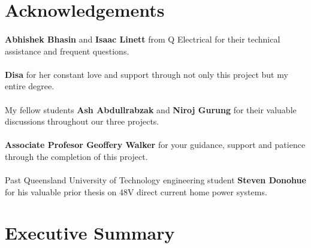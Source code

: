 \newpage


\section*{Acknowledgements}

\paragraph{}
\textbf{Abhishek Bhasin} and \textbf{Isaac Linett} from Q Electrical for their technical assistance and frequent questions.

\paragraph{}
\textbf{Disa} for her constant love and support through not only this project but my entire degree.    

\paragraph{}
My fellow students \textbf{Ash Abdullrabzak} and \textbf{Niroj Gurung} for their valuable discussions throughout our three projects. 

\paragraph{}
\textbf{Associate Profesor Geoffery Walker} for your guidance, support and patience through the completion of this project. 

\paragraph{}
Past Queensland University of Technology engineering student \textbf{Steven Donohue} for his valuable prior thesis on 48V direct current home power systems.  

\newpage


\section*{Executive Summary}

